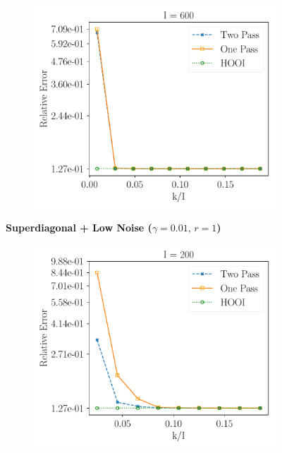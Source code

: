 \begin{figure}[H]
\begin{subfigure}{0.32\textwidth}
    \end{subfigure}
    \begin{subfigure}{0.32\textwidth}
    \includegraphics[scale = 0.3]{figure/fpd_n600.pdf}
    \end{subfigure}
\textbf{Superdiagonal + Low Noise ($\gamma = 0.01, \, r = 1$)}\\
    \centering 
    \begin{subfigure}{0.32\textwidth}
    \includegraphics[scale = 0.3]{figure/fpd_n200.pdf}
    \end{subfigure}

\end{figure}
